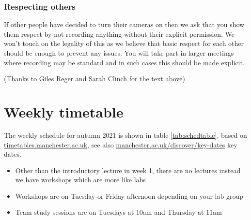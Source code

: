 \documentclass[
]{book}
\providecommand{\tightlist}{%
  \setlength{\itemsep}{0pt}\setlength{\parskip}{0pt}}
\begin{document}
\hypertarget{respecting}{%
\subsection{Respecting others}\label{respecting}}

If other people have decided to turn their cameras on then we ask that you show them respect by not recording anything without their explicit permission. We won't touch on the legality of this as we believe that basic respect for each other should be enough to prevent any issues. You will take part in larger meetings where recording may be standard and in such cases this should be made explicit.

(Thanks to Giles Reger and Sarah Clinch for the text above)

\hypertarget{timetabling}{%
\chapter*{Weekly timetable}\label{timetabling}}

The weekly schedule for autumn 2021 is shown in table \ref{tab:schedtable}, based on \href{https://timetables.manchester.ac.uk/}{timetables.manchester.ac.uk}, see also \href{https://www.manchester.ac.uk/discover/key-dates/}{manchester.ac.uk/discover/key-dates} key dates.

\begin{itemize}
\tightlist
\item
  Other than the introductory lecture in week 1, there are no lectures instead we have workshops which are more like labs
\item
  Workshops are on Tuesday or Friday afternoon depending on your lab group
\item
  Team study sessions are on Tuesdays at 10am and Thursday at 11am
\end{itemize}
\end{document}

